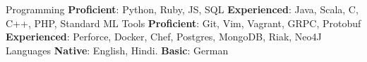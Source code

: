 

\begin{cvskills}

  \cvskill
    {Programming} %
    {\textbf{Proficient}: Python, Ruby, JS, SQL} %
    {\textbf{Experienced}: Java, Scala, C, C++, PHP, Standard ML}
  \cvskill
    {Tools} %
    {\textbf{Proficient}: Git, Vim, Vagrant, GRPC, Protobuf} %
    {\textbf{Experienced}: Perforce, Docker, Chef, Postgres, MongoDB, Riak, Neo4J}
  \cvskill
    {Languages} %
    {\textbf{Native}: English, Hindi.} %
    {\textbf{Basic}: German}
\end{cvskills}
